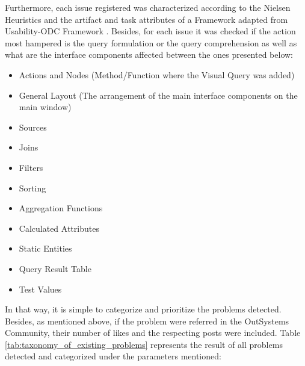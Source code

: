 Furthermore, each issue registered was characterized according to the Nielsen Heuristics \cite{nielsen_heuristics} and the artifact and task attributes of a Framework adapted from Usability-ODC Framework \cite{in_process_usability_problem_classification_analysis_improvement}. Besides, for each issue it was checked if the action most hampered is the query formulation or the query comprehension as well as what are the interface components affected between the ones presented below:

\begin{itemize}
    \item Actions and Nodes (Method/Function where the Visual Query was added)
    \item General Layout (The arrangement of the main interface components on the main window)
    \item Sources
    \item Joins
    \item Filters
    \item Sorting
    \item Aggregation Functions
    \item Calculated Attributes
    \item Static Entities
    \item Query Result Table
    \item Test Values
\end{itemize}

In that way, it is simple to categorize and prioritize the problems detected. Besides, as mentioned above, if the problem were referred in the OutSystems Community, their number of likes and the respecting posts were included. Table \ref{tab:taxonomy_of_existing_problems} represents the result of all problems detected and categorized under the parameters mentioned:

